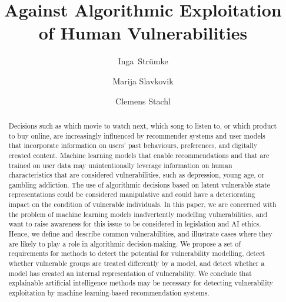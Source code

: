 \documentclass[11pt,theapa]{article}
\theoremstyle{plain}
\begin{document}
\title{Against Algorithmic Exploitation of Human Vulnerabilities}
\author{Inga~Str{\"u}mke  \and
       Marija Slavkovik\and Clemens Stachl 
     }





\maketitle

\begin{abstract}
Decisions such as which movie to watch next, which song to listen to, or which product to buy online, 
are increasingly influenced by recommender systems and user models that incorporate information on users' past behaviours, preferences, and digitally created content. Machine learning models that enable recommendations and that are trained on user data may unintentionally leverage information on human characteristics that are considered vulnerabilities, such as depression, young age, or gambling addiction. The use of algorithmic decisions based on latent vulnerable state representations could be considered manipulative and could have a deteriorating impact on the condition of vulnerable individuals. In this paper, we are concerned with the problem of machine learning models inadvertently modelling vulnerabilities, and want to raise awareness for this issue to be considered in legislation and AI ethics. Hence, we define and describe common vulnerabilities, and illustrate cases where they are likely to play a role in algorithmic decision-making. We propose a set of requirements for methods to detect the potential for vulnerability modelling, detect whether vulnerable groups are treated differently by a model, and detect whether a model has created an internal representation of vulnerability. We conclude that explainable artificial intelligence methods may be necessary for detecting vulnerability exploitation by machine learning-based recommendation systems.
\end{abstract}
\end{document}
